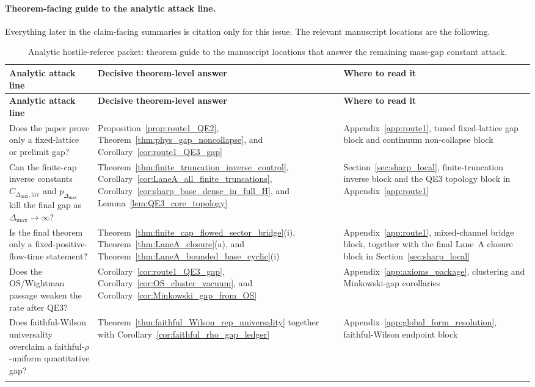 \paragraph{Theorem-facing guide to the analytic attack line.}
Everything later in the claim-facing summaries is citation only for this issue.
The relevant manuscript locations are the following.

\begingroup
\footnotesize
\setlength{\tabcolsep}{4pt}
\begin{longtable}{@{}
>{\RaggedRight\arraybackslash}p{}
>{\RaggedRight\arraybackslash}p{}
>{\RaggedRight\arraybackslash}p{}@{}}
\toprule
\textbf{Analytic attack line} & \textbf{Decisive theorem-level answer} & \textbf{Where to read it}\\
\midrule
\endfirsthead
\toprule
\textbf{Analytic attack line} & \textbf{Decisive theorem-level answer} & \textbf{Where to read it}\\
\midrule
\endhead
Does the paper prove only a fixed-lattice or prelimit gap? & Proposition~\ref{prop:route1_QE2}, Theorem~\ref{thm:phys_gap_noncollapse}, and Corollary~\ref{cor:route1_QE3_gap} & Appendix~\ref{app:route1}, tuned fixed-lattice gap block and continuum non-collapse block\\[0.35em]

Can the finite-cap inverse constants $C_{\Delta_{\max},\mathrm{inv}}$ and $p_{\Delta_{\max}}$ kill the final gap as $\Delta_{\max}\to\infty$? & Theorem~\ref{thm:finite_truncation_inverse_control}, Corollary~\ref{cor:LaneA_all_finite_truncations}, Corollary~\ref{cor:sharp_base_dense_in_full_H}, and Lemma~\ref{lem:QE3_core_topology} & Section~\ref{sec:sharp_local}, finite-truncation inverse block and the QE3 topology block in Appendix~\ref{app:route1}\\[0.35em]

Is the final theorem only a fixed-positive-flow-time statement? & Theorem~\ref{thm:finite_cap_flowed_sector_bridge}(i), Theorem~\ref{thm:LaneA_closure}(a), and Theorem~\ref{thm:LaneA_bounded_base_cyclic}(i) & Appendix~\ref{app:route1}, mixed-channel bridge block, together with the final Lane~A closure block in Section~\ref{sec:sharp_local}\\[0.35em]

Does the OS/Wightman passage weaken the rate after QE3? & Corollary~\ref{cor:route1_QE3_gap}, Corollary~\ref{cor:OS_cluster_vacuum}, and Corollary~\ref{cor:Minkowski_gap_from_OS} & Appendix~\ref{app:axioms_package}, clustering and Minkowski-gap corollaries\\[0.35em]

Does faithful-Wilson universality overclaim a faithful-$\rho$-uniform quantitative gap? & Theorem~\ref{thm:faithful_Wilson_rep_universality} together with Corollary~\ref{cor:faithful_rho_gap_ledger} & Appendix~\ref{app:global_form_resolution}, faithful-Wilson endpoint block\\
\bottomrule
\caption{Analytic hostile-referee packet: theorem guide to the manuscript locations that answer the remaining mass-gap constant attack.}\label{tab:analytic_gap_packet_file_map}
\end{longtable}
\endgroup

